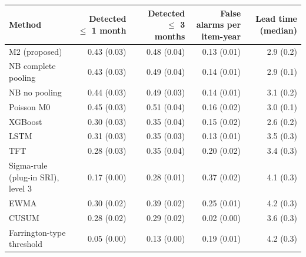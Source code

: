 \documentclass[10pt,a4paper]{article}
\begin{document}
\vspace{6pt}
\noindent\begin{minipage}{\linewidth}
\centering\footnotesize
\begin{tabular}{lrrrr}
\toprule
Method & Detected $\le$ 1 month & Detected $\le$ 3 months & False alarms per item-year & Lead time (median) \\ \midrule
M2 (proposed) & 0.43 (0.03) & 0.48 (0.04) & 0.13 (0.01) & 2.9 (0.2) \\
NB complete pooling & 0.43 (0.03) & 0.49 (0.04) & 0.14 (0.01) & 2.9 (0.1) \\
NB no pooling & 0.44 (0.03) & 0.49 (0.03) & 0.14 (0.01) & 3.1 (0.2) \\
Poisson M0 & 0.45 (0.03) & 0.51 (0.04) & 0.16 (0.02) & 3.0 (0.1) \\
XGBoost & 0.30 (0.03) & 0.35 (0.04) & 0.15 (0.02) & 2.6 (0.2) \\
LSTM & 0.31 (0.03) & 0.35 (0.03) & 0.13 (0.01) & 3.5 (0.3) \\
TFT & 0.28 (0.03) & 0.35 (0.04) & 0.20 (0.02) & 3.4 (0.3) \\
Sigma-rule (plug-in SRI), level 3 & 0.17 (0.00) & 0.28 (0.01) & 0.37 (0.02) & 4.1 (0.3) \\
EWMA & 0.30 (0.02) & 0.39 (0.02) & 0.25 (0.01) & 4.2 (0.3) \\
CUSUM & 0.28 (0.02) & 0.29 (0.02) & 0.02 (0.00) & 3.6 (0.3) \\
Farrington-type threshold & 0.05 (0.00) & 0.13 (0.00) & 0.19 (0.01) & 4.2 (0.3) \\
\bottomrule
\end{tabular}
\end{minipage}
\vspace{8pt}
\end{document}
